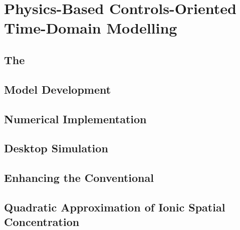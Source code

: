 
\clearpage
\chapter{Physics-Based Controls-Oriented Time-Domain Modelling}\label{ch:spmanalysis}
\startcontents[chapters]

\graphicspath{{5/figures/}}


\section{The }\label{sec:spmintro}


\section{ Model Development}\label{sec:spmmodeldevelopment}


\section{Numerical Implementation}\label{sec:numericalimplementation}


\section{Desktop Simulation}\label{sec:basicspmsimresults}



\section{Enhancing the Conventional }\label{sec:electrolyteinclusion}


\section{Quadratic Approximation of Ionic Spatial Concentration}\label{sec:quadraticapprox}


